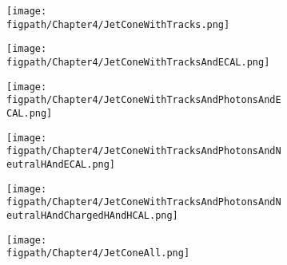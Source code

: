 \begin{figure}[!hbt]
    \centering
    \begin{subfigure}[t]{0.32\textwidth}
        \texttt{[image: \\figpath/Chapter4/JetConeWithTracks.png]}
        \caption{}
        \label{fig:jc_track}
    \end{subfigure}
    \begin{subfigure}[t]{0.32\textwidth}
        \texttt{[image: \\figpath/Chapter4/JetConeWithTracksAndECAL.png]}
        \caption{}
        \label{fig:jc_track_ecal}
    \end{subfigure}
    \begin{subfigure}[t]{0.32\textwidth}
        \texttt{[image: \\figpath/Chapter4/JetConeWithTracksAndPhotonsAndECAL.png]}
        \caption{}
        \label{fig:jc_track_photon_ecal}
    \end{subfigure}

    \begin{subfigure}[t]{0.32\textwidth}
        \texttt{[image: \\figpath/Chapter4/JetConeWithTracksAndPhotonsAndNeutralHAndECAL.png]}
        \caption{}
        \label{fig:jc_track_photon_neutralH_ecal}
    \end{subfigure}
    \begin{subfigure}[t]{0.32\textwidth}
        \texttt{[image: \\figpath/Chapter4/JetConeWithTracksAndPhotonsAndNeutralHAndChargedHAndHCAL.png]}
        \caption{}
        \label{fig:jc_track_photon_neutralH_chargedH_hcal}
    \end{subfigure}
    \begin{subfigure}[t]{0.32\textwidth}
        \texttt{[image: \\figpath/Chapter4/JetConeAll.png]}
        \caption{}
        \label{fig:jc_all}
    \end{subfigure}


\end{figure}
